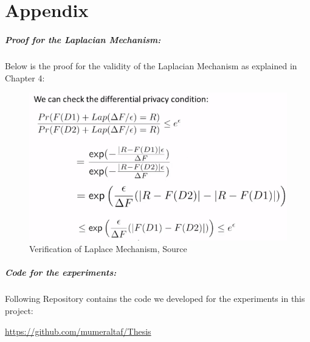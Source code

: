 \documentclass[12pt]{report}
\theoremstyle{named}
\begin{document}


\appendix
\chapter{Appendix}
\label{Appendix}
\paragraph{Proof for the Laplacian Mechanism:\\}
Below is the proof for the validity of the Laplacian Mechanism as explained in Chapter 4:
\begin{figure}[ht]
\centering
        \includegraphics[width=130mm,scale=1]{Images/ProofForLaplace.PNG}
    \caption{Verification of Laplace Mechanism, Source\cite{LaplaceVaiditity}}
    \label{fig:Laplace Verified}
\end{figure}

\paragraph{Code for the experiments:\\}
Following Repository contains the code we developed for the experiments in this project:


\url{https://github.com/mumeraltaf/Thesis}
\end{document}

